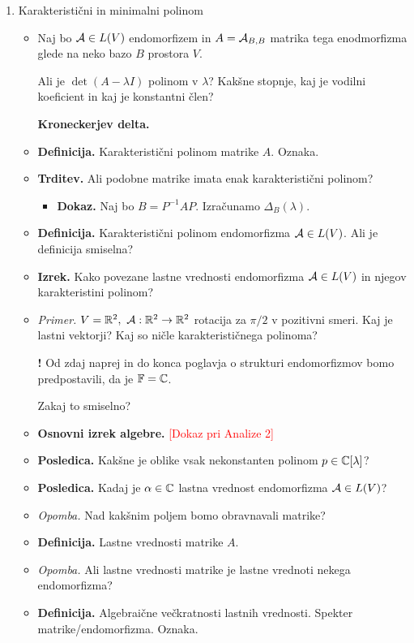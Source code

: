 \begin{enumerate}
    \item Karakteristični in minimalni polinom
    \begin{itemize}
        \item Naj bo $\mathcal{A} \in L(V)$ endomorfizem in $A = \mathcal{A}_{B, B}$ matrika tega enodmorfizma glede na neko bazo $B$ prostora $V$. 
        
        Ali je $\det (A - \lambda I)$ polinom v $\lambda$? Kakšne stopnje, kaj je vodilni koeficient in kaj je konstantni člen?
        
        \textbf{Kroneckerjev delta.}
        \item \colorbox{purple!30}{\textbf{Definicija.}} Karakteristični polinom matrike $A$. Oznaka.
        \item \colorbox{blue!30}{\textbf{Trditev.}} Ali podobne matrike imata enak karakteristični polinom?
        \begin{itemize}
            \item \colorbox{green!30}{\textbf{Dokaz.}} Naj bo $B = P^{-1}AP$. Izračunamo $\Delta_B(\lambda)$.
        \end{itemize}
        \item \colorbox{purple!30}{\textbf{Definicija.}} Karakteristični polinom endomorfizma $\mathcal{A} \in L(V)$. Ali je definicija smiselna?
        \item \colorbox{blue!30}{\textbf{Izrek.}} Kako povezane lastne vrednosti endomorfizma $\mathcal{A} \in L(V)$ in njegov karakteristini polinom?
        \item \colorbox{yellow!30}{\emph{Primer.}} $V = \mathbb{R}^2, \ \mathcal{A}: \mathbb{R}^2 \to \mathbb{R}^2$ rotacija za $\pi/2$ v pozitivni smeri. Kaj je lastni vektorji? Kaj so ničle karakterističnega polinoma?
        \item[\textbf{!}] Od zdaj naprej in do konca poglavja o strukturi endomorfizmov bomo predpostavili, da je $\mathbb{F} = \mathbb{C}$. 
        
        Zakaj to smiselno?
        \item \colorbox{blue!30}{\textbf{Osnovni izrek algebre.}} \textcolor{red}{[Dokaz pri Analize 2]}
        \item \colorbox{orange!30}{\textbf{Posledica.}} Kakšne je oblike vsak nekonstanten polinom $p \in \mathbb{C}[\lambda]$?
        \item \colorbox{orange!30}{\textbf{Posledica.}} Kadaj je $\alpha \in \mathbb{C}$ lastna vrednost endomorfizma $\mathcal{A} \in L(V)$?
        \item \colorbox{yellow!30}{\emph{Opomba.}} Nad kakšnim poljem bomo obravnavali matrike?
        \item \colorbox{purple!30}{\textbf{Definicija.}} Lastne vrednosti matrike $A$. 
        \item \colorbox{yellow!30}{\emph{Opomba.}} Ali lastne vrednosti matrike je lastne vrednoti nekega endomorfizma?
        \item \colorbox{purple!30}{\textbf{Definicija.}} Algebraične večkratnosti lastnih vrednosti. Spekter matrike/endomorfizma. 
        Oznaka.  
        

\end{itemize}
\end{enumerate}
